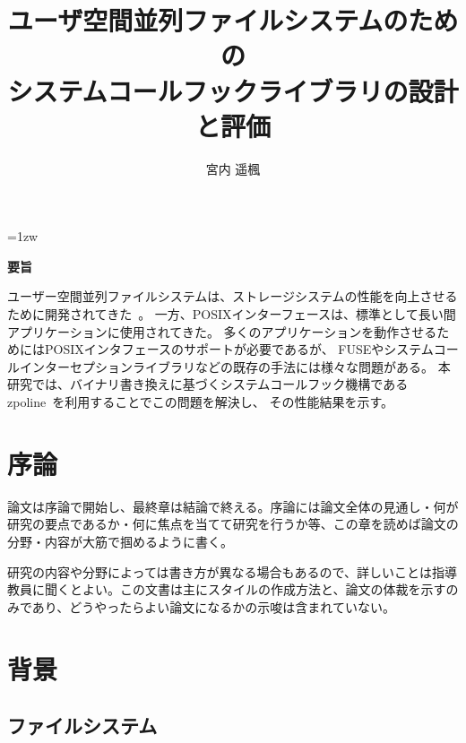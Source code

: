 \documentclass[a4paper,11pt]{jreport}
\title{ユーザ空間並列ファイルシステムのための\\システムコールフックライブラリの設計と評価}
\author{宮内 遥楓}
\begin{document}
\maketitle
\thispagestyle{empty}
\newpage

\thispagestyle{empty}
\vspace*{20pt plus 1fil}
\parindent=1zw
\noindent
\begin{center}
{\Large \bf 要旨}
\vspace{2cm}
\end{center}
ユーザー空間並列ファイルシステムは、ストレージシステムの性能を向上させるために開発されてきた~\cite{tatebe2022chfs, 8514892, 10177390}。 
一方、POSIXインターフェースは、標準として長い間アプリケーションに使用されてきた。 
多くのアプリケーションを動作させるためにはPOSIXインタフェースのサポートが必要であるが、
FUSEやシステムコールインターセプションライブラリなどの既存の手法には様々な問題がある。
本研究では、バイナリ書き換えに基づくシステムコールフック機構であるzpoline~\cite{288689}を利用することでこの問題を解決し、
その性能結果を示す。

\par
\vspace{0pt plus 1fil}
\newpage

\tableofcontents
\listoffigures

\pagebreak \setcounter{page}{1}

\chapter{序論}

論文は序論で開始し、最終章は結論で終える。序論には論文全体の見通し・何が
研究の要点であるか・何に焦点を当てて研究を行うか等、この章を読めば論文の
分野・内容が大筋で掴めるように書く。

研究の内容や分野によっては書き方が異なる場合もあるので、詳しいことは指導
教員に聞くとよい。この文書は主にスタイルの作成方法と、論文の体裁を示すの
みであり、どうやったらよい論文になるかの示唆は含まれていない。

\chapter{背景}

\section{ファイルシステム}
\end{document}
